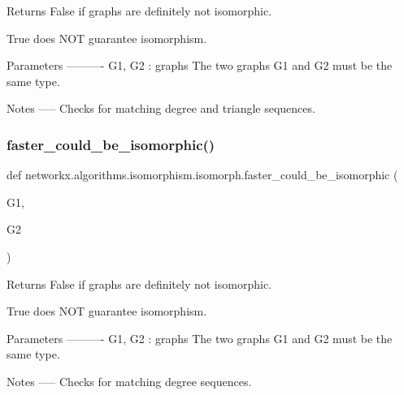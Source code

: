 \begin{DoxyVerb}Returns False if graphs are definitely not isomorphic.

True does NOT guarantee isomorphism.

Parameters
----------
G1, G2 : graphs
   The two graphs G1 and G2 must be the same type.

Notes
-----
Checks for matching degree and triangle sequences.
\end{DoxyVerb}
 \mbox{\label{namespacenetworkx_1_1algorithms_1_1isomorphism_1_1isomorph_a40d948a8ea317549e4715308785cd33d}} 
\subsubsection{\texorpdfstring{faster\+\_\+could\+\_\+be\+\_\+isomorphic()}{faster\_could\_be\_isomorphic()}}
{\footnotesize\ttfamily def networkx.\+algorithms.\+isomorphism.\+isomorph.\+faster\+\_\+could\+\_\+be\+\_\+isomorphic (\begin{DoxyParamCaption}\item[{}]{G1,  }\item[{}]{G2 }\end{DoxyParamCaption})}

\begin{DoxyVerb}Returns False if graphs are definitely not isomorphic.

True does NOT guarantee isomorphism.

Parameters
----------
G1, G2 : graphs
   The two graphs G1 and G2 must be the same type.

Notes
-----
Checks for matching degree sequences.
\end{DoxyVerb}
 \mbox{\label{namespacenetworkx_1_1algorithms_1_1isomorphism_1_1isomorph_a7f9257d6b4a3d4c8f699207d22f26d93}} 

